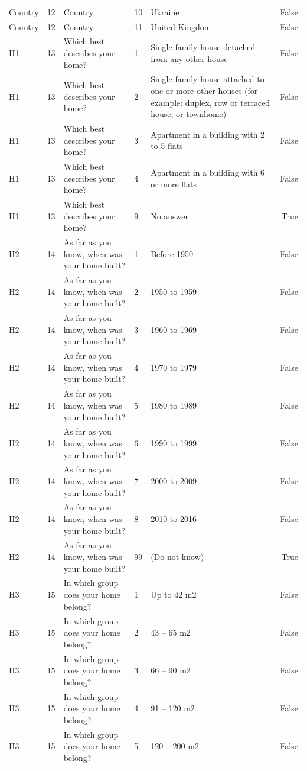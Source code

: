 \begin{tabular}{lrlllr}
Country & 12 & Country & 10 & Ukraine & False \\
Country & 12 & Country & 11 & United Kingdom & False \\
H1 & 13 & Which best describes your home?  & 1 & Single-family house detached from any other house & False \\
H1 & 13 & Which best describes your home?  & 2 & Single-family house attached to one or more other houses (for example: duplex, row or terraced house, or townhome) & False \\
H1 & 13 & Which best describes your home?  & 3 & Apartment in a building with 2 to 5 flats & False \\
H1 & 13 & Which best describes your home?  & 4 & Apartment in a building with 6 or more flats & False \\
H1 & 13 & Which best describes your home?  & 9 & No answer & True \\
H2 & 14 & As far as you know, when was your home built? & 1 & Before 1950 & False \\
H2 & 14 & As far as you know, when was your home built? & 2 & 1950 to 1959 & False \\
H2 & 14 & As far as you know, when was your home built? & 3 & 1960 to 1969 & False \\
H2 & 14 & As far as you know, when was your home built? & 4 & 1970 to 1979 & False \\
H2 & 14 & As far as you know, when was your home built? & 5 & 1980 to 1989 & False \\
H2 & 14 & As far as you know, when was your home built? & 6 & 1990 to 1999 & False \\
H2 & 14 & As far as you know, when was your home built? & 7 & 2000 to 2009 & False \\
H2 & 14 & As far as you know, when was your home built? & 8 & 2010 to 2016 & False \\
H2 & 14 & As far as you know, when was your home built? & 99 & (Do not know) & True \\
H3 & 15 & In which group does your home belong? & 1 & Up to 42 m2 & False \\
H3 & 15 & In which group does your home belong? & 2 & 43 – 65 m2 & False \\
H3 & 15 & In which group does your home belong? & 3 & 66 – 90 m2 & False \\
H3 & 15 & In which group does your home belong? & 4 & 91 – 120 m2 & False \\
H3 & 15 & In which group does your home belong? & 5 & 120 – 200 m2 & False \\

\end{tabular}
